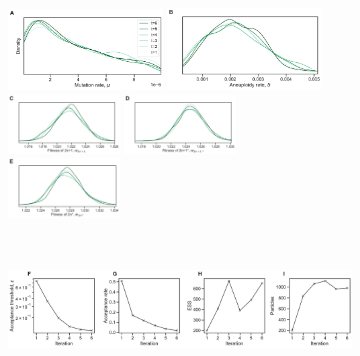 \documentclass[12pt]{extarticle}
\begin{document}
\begin{figure}[h]

  \begin{subfigure}{1\textwidth}
    \centering
      \includegraphics[width=0.45\textwidth]{../figures/convergence-p1_mr.pdf}      
      \includegraphics[width=0.45\textwidth]{../figures/convergence-p2_tr.pdf} \\     
      \includegraphics[width=0.325\textwidth]{../figures/convergence-p3_w1.pdf}      
      \includegraphics[width=0.325\textwidth]{../figures/convergence-p4_w2.pdf}      
      \includegraphics[width=0.325\textwidth]{../figures/convergence-p5_w3.pdf}      
     \label{fig:convergence-A}
    \end{subfigure}
    \\    
  \begin{subfigure}{1\textwidth}
  	\includegraphics[width=\textwidth]{../figures/ess.pdf}

\end{subfigure}
\end{figure}
\end{document}
